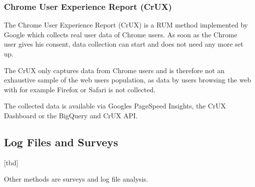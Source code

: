 \subsubsection{Chrome User Experience Report (CrUX)}


The Chrome User Experience Report (CrUX) is a RUM method implemented by Google which collects real user data of Chrome users.
As soon as the Chrome user gives his consent, data collection can start and does not need any more set up.

The CrUX only captures data from Chrome users and is therefore not an exhaustive sample of the web users population, as data by users browsing the web with for example Firefox or Safari is not collected.

The collected data is available via Googles PageSpeed Insights, the CrUX Dashboard or the BigQuery and CrUX API. %







\subsection{Log Files and Surveys}

[tbd]

Other methods are surveys and log file analysis.




